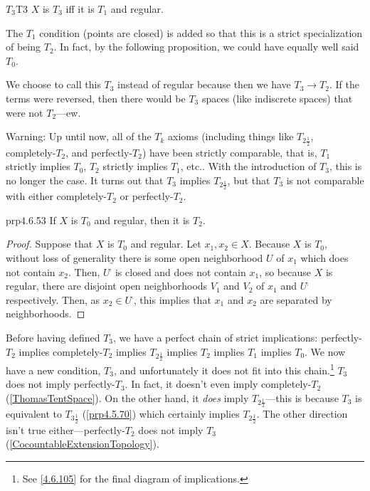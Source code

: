 \begin{dfn}{$T_3$}{T3}
$X$ is $T_3$ iff it is $T_1$ and regular.
\begin{rmk}
The $T_1$ condition (points are closed) is added so that this is a strict specialization of being $T_2$.  In fact, by the following proposition, we could have equally well said $T_0$.
\end{rmk}
\begin{rmk}
We choose to call this $T_3$ instead of regular because then we have $T_3\rightarrow T_2$.  If the terms were reversed, then there would be $T_3$ spaces (like indiscrete spaces) that were not $T_2$---ew.
\end{rmk}
\begin{wrn}
Warning:  Up until now, all of the $T_k$ axioms (including things like $T_{2\frac{1}{2}}$, completely-$T_2$, and perfectly-$T_2$) have been strictly comparable, that is, $T_1$ strictly implies $T_0$, $T_2$ strictly implies $T_1$, etc..  With the introduction of $T_3$, this is no longer the case.  It turns out that $T_3$ implies $T_{2\frac{1}{2}}$, but that $T_3$ is not comparable with either completely-$T_2$ or perfectly-$T_2$.
\end{wrn}
\end{dfn}
\begin{prp}{}{prp4.6.53}
If $X$ is $T_0$ and regular, then it is $T_2$.
\begin{proof}
Suppose that $X$ is $T_0$ and regular.  Let $x_1,x_2\in X$.  Because $X$ is $T_0$, without loss of generality there is some open neighborhood $U$ of $x_1$ which does not contain $x_2$.  Then, $U^{\comp}$ is closed and does not contain $x_1$, so because $X$ is regular, there are disjoint open neighborhoods $V_1$ and $V_2$ of $x_1$ and $U^{\comp}$ respectively.  Then, as $x_2\in U^{\comp}$, this implies that $x_1$ and $x_2$ are separated by neighborhoods.
\end{proof}
\end{prp}
Before having defined $T_3$, we have a perfect chain of strict implications:  perfectly-$T_2$ implies completely-$T_2$ implies $T_{2\frac{1}{2}}$ implies $T_2$ implies $T_1$ implies $T_0$.  We now have a new condition, $T_3$, and unfortunately it does not fit into this chain.\footnote{See \eqref{4.6.105} for the final diagram of implications.}  $T_3$ does not imply perfectly-$T_3$.  In fact, it doesn't even imply completely-$T_2$ (\cref{ThomasTentSpace}).  On the other hand, it \emph{does} imply $T_{2\frac{1}{2}}$---this is because $T_3$ is equivalent to $T_{3\frac{1}{2}}$ (\cref{prp4.5.70}) which certainly implies $T_{2\frac{1}{2}}$.  The other direction isn't true either---perfectly-$T_2$ does not imply $T_3$ (\cref{CocountableExtensionTopology}).
